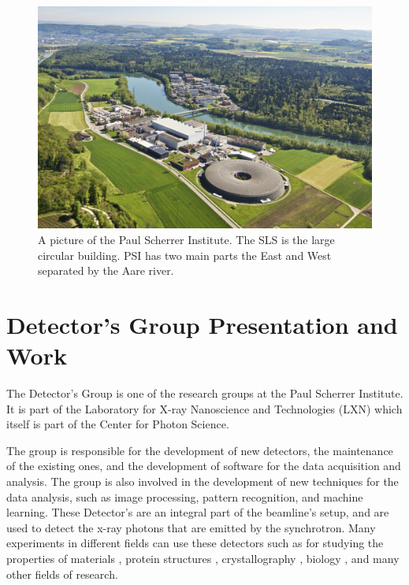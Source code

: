 \begin{spacing}{1.2}
    \begin{figure}
        \centering
        \includegraphics[width=\textwidth]{Chapitre1/figures/psi.jpg}
        \caption{A picture of the Paul Scherrer Institute. The SLS is the large circular building. 
         PSI has two main parts the East and West separated by the Aare river.}
        \label{fig:sls}
    \end{figure}

    \section{Detector's Group Presentation and Work}
    The Detector's Group is one of the research groups at the Paul Scherrer Institute. It is part of the Laboratory for X-ray Nanoscience and Technologies (LXN) which itself
    is part of the Center for Photon Science.

    The group is responsible for the development of new detectors, the maintenance of the existing ones, and the
    development of software for the data acquisition and analysis. 
    The group is also involved in the development of new techniques for the data analysis, such as image processing,
    pattern recognition, and machine learning.
    These Detector's are an integral part of the beamline's setup, and are used to detect the x-ray photons that are
    emitted by the synchrotron. Many experiments in different fields can use these detectors such as for studying the properties of materials \cite{butcher2024ptychographic},
    protein structures \cite{pomeranz2009crystal}, crystallography \cite{leonarski2023kilohertz}, biology \cite{lemcoff2023brilliant,dullin2024vivo}, and many other fields of research.


\end{spacing}

